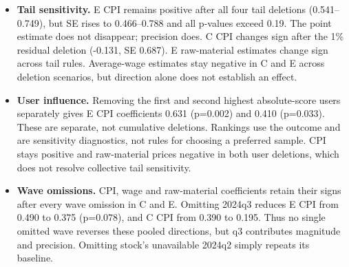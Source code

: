 \begin{itemize}
\item \textbf{Tail sensitivity.} E CPI remains positive after all four tail deletions (0.541--0.749), but SE rises to 0.466--0.788 and all p-values exceed 0.19. The point estimate does not disappear; precision does. C CPI changes sign after the 1\% residual deletion (-0.131, SE 0.687). E raw-material estimates change sign across tail rules. Average-wage estimates stay negative in C and E across deletion scenarios, but direction alone does not establish an effect.

\item \textbf{User influence.} Removing the first and second highest absolute-score users separately gives E CPI coefficients 0.631 (p=0.002) and 0.410 (p=0.033). These are separate, not cumulative deletions. Rankings use the outcome and are sensitivity diagnostics, not rules for choosing a preferred sample. CPI stays positive and raw-material prices negative in both user deletions, which does not resolve collective tail sensitivity.

\item \textbf{Wave omissions.} CPI, wage and raw-material coefficients retain their signs after every wave omission in C and E. Omitting 2024q3 reduces E CPI from 0.490 to 0.375 (p=0.078), and C CPI from 0.390 to 0.195. Thus no single omitted wave reverses these pooled directions, but q3 contributes magnitude and precision. Omitting stock's unavailable 2024q2 simply repeats its baseline.
\end{itemize}

